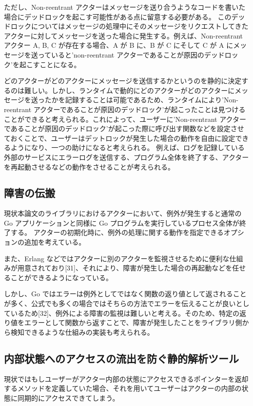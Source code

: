 ただし、Non-reentrant
アクターはメッセージを送り合うようなコードを書いた場合にデッドロックを起こす可能性がある点に留意する必要がある。
このデッドロックについてはメッセージの処理中にそのメッセージをリクエストしてきたアクターに対してメッセージを送った場合に発生する。例えば、Non-reentrant
アクター A, B, C が存在する場合、A が B に、B が C にそして C が A
にメッセージを送っていると'non-reentrant
アクターであることが原因のデッドロック'を起こすことになる。

どのアクターがどのアクターにメッセージを送信するかというのを静的に決定するのは難しい。しかし、ランタイムで動的にどのアクターがどのアクターにメッセージを送ったかを記録することは可能であるため、ランタイムにより'Non-reentrant
アクターであることが原因のデッドロック'が起こったことは見つけることができると考えられる。これによって、ユーザーに'Non-reentrant
アクターであることが原因のデッドロック'が起こった際に呼び出す関数などを設定させておくことで、ユーザーはデットロックが発生した場合の動作を自由に設定できるようになり、一つの助けになると考えられる。
例えば、ログを記録している外部のサービスにエラーログを送信する、プログラム全体を終了する、アクターを再起動させるなどの動作をさせることが考えられる。

\subsection{障害の伝搬}

現状本論文のライブラリにおけるアクターにおいて、例外が発生すると通常の
Go アプリケーションと同様に Go
プログラムを実行しているプロセス全体が終了する。
アクターの初期化時に、例外の処理に関する動作を指定できるオプションの追加を考えている。

また、Erlang
などではアクターに別のアクターを監視させるために便利な仕組みが用意されており{[}31{]}、それにより、障害が発生した場合の再起動などを任せることができるようになっている。

しかし、Go
ではエラーは例外としてではなく関数の返り値として返されることが多く、公式でも多くの場合ではそちらの方法でエラーを伝えることが良いとしているため{[}32{]}、例外による障害の監視は難しいと考える。そのため、特定の返り値をエラーとして関数から返すことで、障害が発生したことをライブラリ側から検知できるような仕組みの実装も考えられる。

\subsection{内部状態へのアクセスの流出を防ぐ静的解析ツール}

現状ではもしユーザーがアクター内部の状態にアクセスできるポインターを返却するメソッドを定義していた場合、それを用いてユーザーはアクターの内部の状態に同期的にアクセスできてしまう。

